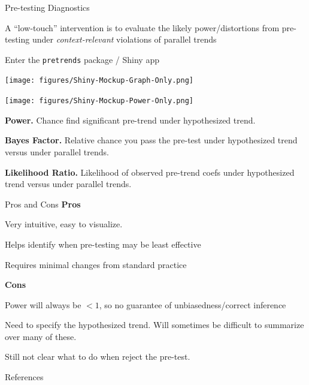 \documentclass[aspectratio = 169, 13pt]{beamer}
\begin{document}
\begin{frame}[label = power_analysis]{Pre-testing Diagnostics}
	\begin{wideitemize}
		\item
		A ``low-touch'' intervention is to evaluate the likely power/distortions from pre-testing under \textit{context-relevant} violations of parallel trends
		
		\item Enter the \texttt{pretrends} package / Shiny app
	\end{wideitemize}
\end{frame}

\begin{frame}
	\centering
	\texttt{[image: figures/Shiny-Mockup-Graph-Only.png]}   
\end{frame}

\begin{frame}
	\centering
	\texttt{[image: figures/Shiny-Mockup-Power-Only.png]} 
	\begin{wideitemize}
		\item
		\textbf{Power.} Chance find significant pre-trend under hypothesized trend.
		\item
		\textbf{Bayes Factor.} Relative chance you pass the pre-test under hypothesized trend versus under parallel trends.
		\item
		\textbf{Likelihood Ratio.} Likelihood of observed pre-trend coefs under hypothesized trend versus under parallel trends.
	\end{wideitemize}
\end{frame}

\begin{frame}{Pros and Cons}
	\textbf{Pros}
	\begin{wideitemize}
		\item
		Very intuitive, easy to visualize.
		
		\item
		Helps identify when pre-testing may be least effective
		    
		\item
		Requires minimal changes from standard practice
	\end{wideitemize}
	
	\textbf{Cons}
	
	\begin{wideitemize}
		\item
		Power will always be $<1$, so no guarantee of unbiasedness/correct inference
		    
		\item
		Need to specify the hypothesized trend. Will sometimes be difficult to summarize over many of these.
		    
		\item
		Still not clear what to do when reject the pre-test.
	\end{wideitemize}
	    
\end{frame}

\begin{frame}{References}
	\nocite{rambachan_honest_2021}
	
\end{frame}
\end{document}
